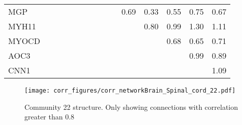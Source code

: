 \begin{longtable}{lrrrrrrrrrrrrrr}
MGP   &             &             &             &            &           &            &             &             &           &        0.69 &        0.33 &       0.55 &       0.75 &       0.67 \\
MYH11 &             &             &             &            &           &            &             &             &           &             &        0.80 &       0.99 &       1.30 &       1.11 \\
MYOCD &             &             &             &            &           &            &             &             &           &             &             &       0.68 &       0.65 &       0.71 \\
AOC3  &             &             &             &            &           &            &             &             &           &             &             &            &       0.99 &       0.89 \\
CNN1  &             &             &             &            &           &            &             &             &           &             &             &            &            &       1.09 \\
\end{longtable}


\begin{figure}[h!]
\centering
\texttt{[image: corr\_figures/corr\_networkBrain\_Spinal\_cord\_22.pdf]}
\caption{Community 22 structure. Only showing connections with correlation greater than 0.8}
\end{figure}




